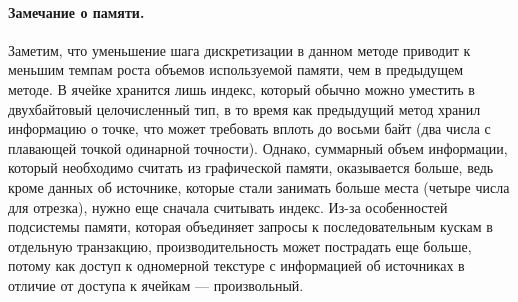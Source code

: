 \documentclass[12pt]{article}
\begin{document}
\paragraph{Замечание о памяти.} Заметим, что уменьшение шага дискретизации
в данном методе приводит к меньшим темпам роста объемов используемой памяти,
чем в предыдущем методе. В ячейке хранится 
лишь индекс, который обычно можно уместить в двухбайтовый целочисленный тип,
в то время как предыдущий метод хранил информацию о точке, что может
требовать вплоть до восьми байт (два числа с плавающей точкой одинарной точности).
Однако, суммарный объем информации, который необходимо считать из графической памяти,
оказывается больше, ведь кроме данных об источнике, которые
стали занимать больше места (четыре числа для отрезка), нужно еще 
сначала считывать индекс. Из-за особенностей подсистемы памяти,
которая объединяет запросы к последовательным кускам в отдельную 
транзакцию, производительность может пострадать еще больше, потому как 
доступ к одномерной текстуре с информацией об источниках в отличие от доступа
к ячейкам --- произвольный.
\end{document}
